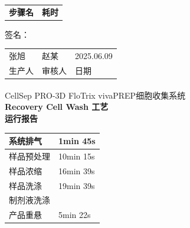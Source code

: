 \documentclass[UTF8,10pt,a4paper,fontset=fandol]{ctexart}
\newcommand{\fieldvalue}[1]{#1}
\newcommand{\handwritten}[1]{#1}
\begin{document}
\vspace{1em}

\begin{tabularx}{\textwidth}{@{}>{\raggedright\arraybackslash}Xl@{}}
\textbf{步骤名} & \textbf{耗时} \\
\end{tabularx}

\vfill

签名：

\begin{tabularx}{\textwidth}{@{}XXX@{}}
\centering
\fieldvalue{\handwritten{张旭}}
&
\centering
\fieldvalue{\handwritten{赵某}}
&
\centering
\fieldvalue{\handwritten{2025.06.09}} \arraybackslash \\[0.3em]
\centering 生产人 & \centering 审核人 & \centering 日期 \arraybackslash \\
\end{tabularx}

\newpage

\begin{center}
{\small CellSep\textsuperscript{\textregistered} PRO-3D FloTrix\textsuperscript{\textregistered} vivaPREP\textsuperscript{\textregistered}细胞收集系统}\\
\textbf{Recovery Cell Wash 工艺}\\
\textbf{运行报告}
\end{center}

\begin{tabularx}{\textwidth}{@{}lX@{}}
系统排气 &
\fieldvalue{1min 45s}\\
\hline
样品预处理 &
\fieldvalue{10min 15s}\\
\hline
样品浓缩 &
\fieldvalue{16min 39s}\\
\hline
样品洗涤 &
\fieldvalue{19min 39s}\\
\hline
制剂液洗涤 &\\
\hline
产品重悬 &
\fieldvalue{5min 22s}
\end{tabularx}
\end{document}
